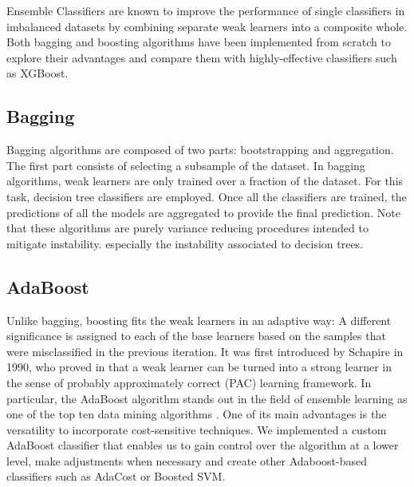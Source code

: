 \documentclass[conference]{IEEEtran}
\begin{document}
Ensemble Classifiers are known to improve the performance of single classifiers in imbalanced datasets \cite{ensembles_review} by combining separate weak learners into a composite whole. Both bagging and boosting algorithms have been implemented from scratch to explore their advantages and compare them with highly-effective classifiers such as XGBoost.

\subsection{Bagging}
Bagging algorithms are composed of two parts: bootstrapping and aggregation. The first part consists of selecting a subsample of the dataset. In bagging algorithms, weak learners are only trained over a fraction of the dataset. For this task, decision tree classifiers are employed. Once all the classifiers are trained, the predictions of all the models are aggregated to provide the final prediction. Note that these algorithms are purely variance reducing procedures intended to mitigate instability. especially the instability associated to decision trees.

\subsection{AdaBoost}
Unlike bagging, boosting fits the weak learners in an adaptive way: A different significance is assigned to each of the base learners based on the samples that were misclassified in the previous iteration. It was first introduced by Schapire in 1990, who proved in \cite{schapire} that a weak learner can be turned into a strong learner in the sense of probably approximately correct (PAC) learning framework. In particular, the AdaBoost algorithm stands out in the field of ensemble learning as one of the top ten data mining algorithms \cite{top10algo}. One of its main advantages is the versatility to incorporate cost-sensitive techniques. We implemented a custom AdaBoost classifier that enables us to gain control over the algorithm at a lower level, make adjustments when necessary and create other Adaboost-based classifiers such as AdaCost or Boosted SVM. %
\end{document}
